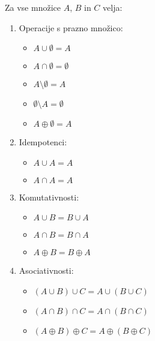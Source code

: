 \documentclass[12pt, a4paper]{article}
\begin{document}
\begin{izrek}
Za vse množice $A$, $B$ in $C$ velja:

\begin{enumerate}[label=(\roman*)]
\item Operacije s prazno množico:

\vspace{-6pt}
\begin{multicols}{3}
\begin{itemize}
\item $A\cup\emptyset = A$
\item $A\cap\emptyset=\emptyset$
\item $A\setminus\emptyset=A$
\item $\emptyset\setminus A=\emptyset$
\item $A\oplus\emptyset=A$
\end{itemize}
\end{multicols}
\vspace{-12pt}

\item Idempotenci:

\vspace{-6pt}
\begin{multicols}{3}
\begin{itemize}
\item $A\cup A=A$ 
\item $A\cap A=A$
\end{itemize}
\end{multicols}
\vspace{-12pt}

\item Komutativnosti:

\vspace{-6pt}
\begin{multicols}{3}
\begin{itemize}
\item $A\cup B=B\cup A$
\item $A\cap B=B\cap A$
\item $A\oplus B=B\oplus A$
\end{itemize}
\end{multicols}
\vspace{-12pt}

\item Asociativnosti:

\begin{itemize}
\item $(A\cup B)\cup C=A\cup(B\cup C)$ 
\item $(A\cap B)\cap C=A\cap (B\cap C)$
\item $(A\oplus B)\oplus C=A\oplus(B\oplus C)$
\end{itemize}


\end{enumerate}
\end{izrek}
\end{document}
